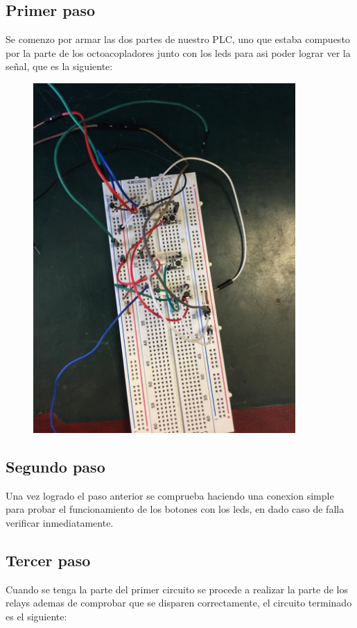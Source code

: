 \documentclass[12pt,a4paper]{article}
\begin{document}
\subsection{Primer paso} Se comenzo por armar las dos partes de nuestro PLC, uno que estaba compuesto por la parte de los octoacopladores junto con los leds para asi poder lograr ver la señal, que es la siguiente:

\begin{figure}[h!]
\centering
\includegraphics[width=10cm]{primeraimagen.jpeg} 
\end{figure}
\newpage

\subsection{Segundo paso} Una vez logrado el paso anterior se comprueba haciendo una conexion simple para probar el funcionamiento de los botones con los leds, en dado caso de falla verificar inmediatamente.

\subsection{Tercer paso} Cuando se tenga la parte del primer circuito se procede a realizar la parte de los relays ademas de comprobar que se disparen correctamente, el circuito terminado es el siguiente:
\end{document}
